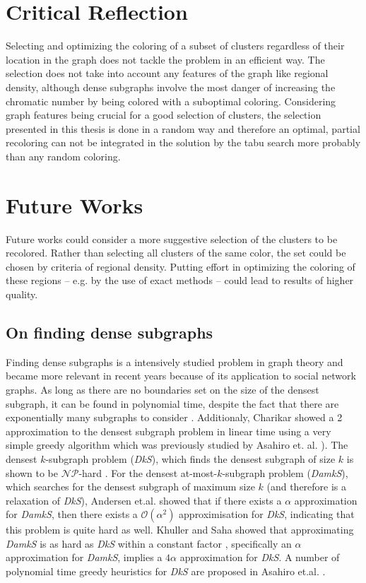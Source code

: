 \section{Critical Reflection}
Selecting and optimizing the coloring of a subset of clusters regardless of their location in the graph does not tackle the problem in an efficient way. The selection does not take into account any features of the graph like regional density, although dense subgraphs involve the most danger of increasing the chromatic number by being colored with a suboptimal coloring. Considering graph features being crucial for a good selection of clusters, the selection presented in this thesis is done in a random way and therefore an optimal, partial recoloring can not be integrated in the solution by the tabu search more probably than any random coloring.  

\section{Future Works}
Future works could consider a more suggestive selection of the clusters to be recolored. Rather than selecting all clusters of the same color, the set could be chosen by criteria of regional density. Putting effort in optimizing the coloring of these regions -- e.g. by the use of exact methods -- could lead to results of higher quality.

\subsection{On finding dense subgraphs}
Finding dense subgraphs is a intensively studied problem in graph theory and became more relevant in recent years because of its application to social network graphs. As long as there are no boundaries set on the size of the densest subgraph, it can be found in polynomial time, despite the fact that there are exponentially many subgraphs to consider \cite{lawler-76, asahiro-02}. Additionaly, Charikar \cite{charikar-00} showed a 2 approximation to the densest subgraph problem in linear time using a very simple greedy algorithm which was previously studied by Asahiro et. al. \cite{asahiroa-00}). The densest $k$-subgraph problem (\textit{DkS}), which finds the densest subgraph of size $k$ is shown to be $\mathcal{NP}$-hard \cite{feige-97,asahiro-02}. For the densest at-most-$k$-subgraph problem (\textit{DamkS}), which searches for the densest subgraph of maximum size $k$ (and therefore is a relaxation of \textit{DkS}), Andersen et.al. \cite{andersen-07} showed that if there exists a $\alpha$ approximation for \textit{DamkS}, then there exists a $\mathcal O(\alpha ^ 2)$ approximisation for \textit{DkS}, indicating that this problem is quite hard as well. Khuller and Saha showed that approximating \textit{DamkS} is as hard as \textit{DkS} within a constant factor \cite{khuller-09}, specifically an $\alpha$ approximation for \textit{DamkS}, implies a $4\alpha$ approximation for \textit{DkS}. A number of polynomial time greedy heuristics for \textit{DkS} are proposed in Asahiro et.al. \cite{asahiroa-00}.

